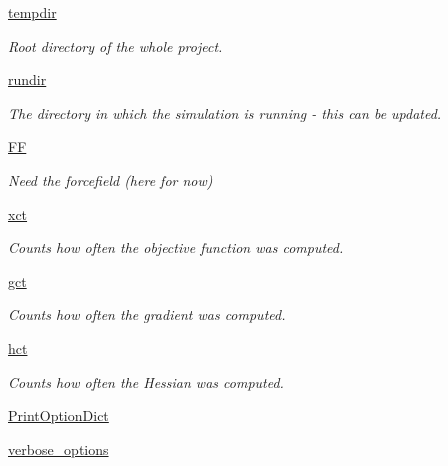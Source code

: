 \begin{DoxyCompactItemize}
\item 
\hyperlink{classforcebalance_1_1target_1_1Target_aa1f01b5b78db253b5b66384ed11ed193}{tempdir}
\begin{DoxyCompactList}\small\item\em Root directory of the whole project. \end{DoxyCompactList}\item 
\hyperlink{classforcebalance_1_1target_1_1Target_a6872de5b2d4273b82336ea5b0da29c9e}{rundir}
\begin{DoxyCompactList}\small\item\em The directory in which the simulation is running -\/ this can be updated. \end{DoxyCompactList}\item 
\hyperlink{classforcebalance_1_1target_1_1Target_a38a37919783141ea37fdcf8b00ce0aaf}{F\-F}
\begin{DoxyCompactList}\small\item\em Need the forcefield (here for now) \end{DoxyCompactList}\item 
\hyperlink{classforcebalance_1_1target_1_1Target_aad2e385cfbf7b4a68f1c2cb41133fe82}{xct}
\begin{DoxyCompactList}\small\item\em Counts how often the objective function was computed. \end{DoxyCompactList}\item 
\hyperlink{classforcebalance_1_1target_1_1Target_aa625ac88c6744eb14ef281d9496d0dbb}{gct}
\begin{DoxyCompactList}\small\item\em Counts how often the gradient was computed. \end{DoxyCompactList}\item 
\hyperlink{classforcebalance_1_1target_1_1Target_a5b5a42f78052b47f29ed4b940c6111a1}{hct}
\begin{DoxyCompactList}\small\item\em Counts how often the Hessian was computed. \end{DoxyCompactList}\item 
\hyperlink{classforcebalance_1_1baseclass_1_1ForceBalanceBaseClass_a5c55e661e746d1a4443f4e0bc34ebe05}{Print\-Option\-Dict}
\item 
\hyperlink{classforcebalance_1_1baseclass_1_1ForceBalanceBaseClass_a8088e1e20cbd6bc175fb9c9fe9fa0f18}{verbose\-\_\-options}
\end{DoxyCompactItemize}


